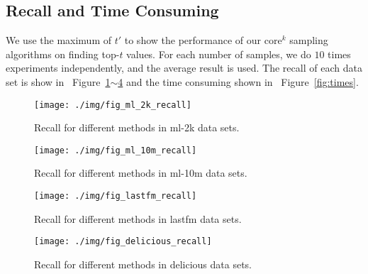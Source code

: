 \documentclass[letterpaper]{article}
\newcommand{\Fig}[1]   {Figure~\ref{fig:#1}}
\newcommand{\Figs}[2]  {Figure~\ref{fig:#1}$\sim$\ref{fig:#2}}
\begin{document}
\subsection{Recall and Time Consuming}
We use the maximum of $t'$
to show the performance of our core$^k$ sampling algorithms on finding top-$t$ values.
For each number of samples, we do $10$ times experiments independently,
and the average result is used.
The recall of each data set is show in ~\Figs{ml_2k_recall}{delicious_recall}
and the time consuming shown in ~\Fig{times}.
\begin{figure}[H]
  \centering
  \texttt{[image: ./img/fig\_ml\_2k\_recall]}\\
  \caption{Recall for different methods in ml-2k data sets.}
  \label{fig:ml_2k_recall}
\end{figure}
\begin{figure}[H]
  \centering
  \texttt{[image: ./img/fig\_ml\_10m\_recall]}\\
  \caption{Recall for different methods in ml-10m data sets.}
  \label{fig:ml_10m_recall}
\end{figure}
\begin{figure}[H]
  \centering
  \texttt{[image: ./img/fig\_lastfm\_recall]}\\
  \caption{Recall for different methods in lastfm data sets.}
  \label{fig:lastfm_recall}
\end{figure}
\begin{figure}[H]
  \centering
  \texttt{[image: ./img/fig\_delicious\_recall]}\\
  \caption{Recall for different methods in delicious data sets.}
  \label{fig:delicious_recall}
\end{figure}
\end{document}

